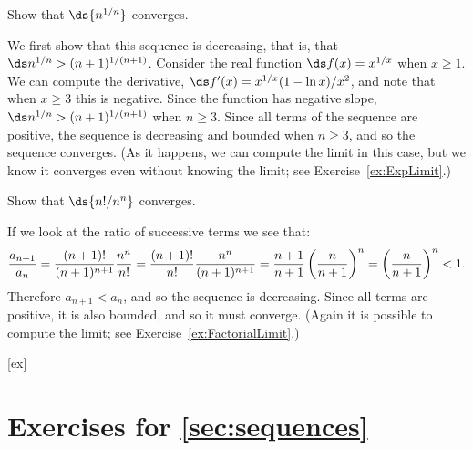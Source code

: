 \begin{example}{}{}
Show that $\ds\{n^{1/n}\}$ converges.
\end{example}
\begin{solution}
We first show that 
this sequence is decreasing, that is, that $\ds n^{1/n}>
(n+1)^{1/(n+1)}$. Consider the real function $\ds f(x)=x^{1/x}$ when
$x\ge1$. We can compute the derivative, $\ds f'(x)=x^{1/x}(1-\ln x)/x^2$,
and note that when $x\ge 3$ this is negative. Since the function has
negative slope, $\ds n^{1/n}>
(n+1)^{1/(n+1)}$ when $n\ge 3$. Since all terms of the sequence are
positive, the sequence is decreasing and bounded when $n\ge3$, and so
the sequence converges. (As it happens, we can compute the limit in
this case, but we know it converges even without knowing the limit; see
Exercise~\ref{ex:ExpLimit}.)
\end{solution}

\begin{example}{}{}
Show that $\ds\{n!/n^n\}$ converges.
\end{example}
\begin{solution}
If we look at the ratio of successive terms we see that:
$$ 
  {a_{n+1}\over a_n} = {(n+1)!\over (n+1)^{n+1}}{n^n\over n!}=
  {(n+1)!\over n!}{n^n\over (n+1)^{n+1}}=
  {n+1\over n+1}\left({n\over n+1}\right)^n=
  \left({n\over n+1}\right)^n < 1.
$$
Therefore $a_{n+1}<a_n$, and so the sequence is decreasing. Since all terms are positive, it is also bounded, and so it must converge.
(Again it is possible to compute the limit; see
Exercise~\ref{ex:FactorialLimit}.)
\end{solution}


[ex]
\section*{Exercises for \ref{sec:sequences}}

